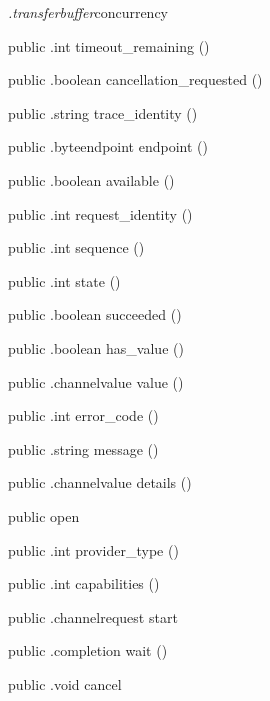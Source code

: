 \begin{CrexxClass}{\textit{.transferbuffer}}{concurrency}
\begin{Members}
    \Method
      {public}
      {.int}
      {timeout\_remaining}
      {()}

    \Method
      {public}
      {.boolean}
      {cancellation\_requested}
      {()}

    \Method
      {public}
      {.string}
      {trace\_identity}
      {()}

    \Method
      {public}
      {.byteendpoint}
      {endpoint}
      {()}

    \Method
      {public}
      {.boolean}
      {available}
      {()}

    \Method
      {public}
      {.int}
      {request\_identity}
      {()}

    \Method
      {public}
      {.int}
      {sequence}
      {()}

    \Method
      {public}
      {.int}
      {state}
      {()}

    \Method
      {public}
      {.boolean}
      {succeeded}
      {()}

    \Method
      {public}
      {.boolean}
      {has\_value}
      {()}

    \Method
      {public}
      {.channelvalue}
      {value}
      {()}

    \Method
      {public}
      {.int}
      {error\_code}
      {()}

    \Method
      {public}
      {.string}
      {message}
      {()}

    \Method
      {public}
      {.channelvalue}
      {details}
      {()}

    \Factory
      {public}
      {open}
      {}

    \Method
      {public}
      {.int}
      {provider\_type}
      {()}

    \Method
      {public}
      {.int}
      {capabilities}
      {()}

    \Method
      {public}
      {.channelrequest}
      {start}
      {}

    \Method
      {public}
      {.completion}
      {wait}
      {()}

    \Method
      {public}
      {.void}
      {cancel}
      {}


\end{Members}
\end{CrexxClass}
